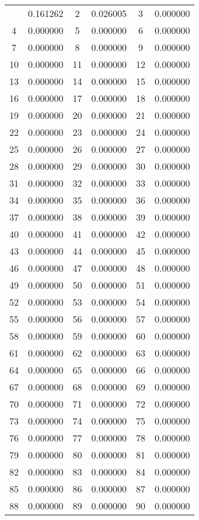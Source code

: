 \documentclass[12pt]{article}
\begin{document}
\begin{longtable}{@{}cc|cc|cc@{}}
\bottomrule
\endlastfoot
1 & 0.161262 & 2 & 0.026005 & 3 & 0.000000 \\
4 & 0.000000 & 5 & 0.000000 & 6 & 0.000000 \\
7 & 0.000000 & 8 & 0.000000 & 9 & 0.000000 \\
10 & 0.000000 & 11 & 0.000000 & 12 & 0.000000 \\
13 & 0.000000 & 14 & 0.000000 & 15 & 0.000000 \\
16 & 0.000000 & 17 & 0.000000 & 18 & 0.000000 \\
19 & 0.000000 & 20 & 0.000000 & 21 & 0.000000 \\
22 & 0.000000 & 23 & 0.000000 & 24 & 0.000000 \\
25 & 0.000000 & 26 & 0.000000 & 27 & 0.000000 \\
28 & 0.000000 & 29 & 0.000000 & 30 & 0.000000 \\
31 & 0.000000 & 32 & 0.000000 & 33 & 0.000000 \\
34 & 0.000000 & 35 & 0.000000 & 36 & 0.000000 \\
37 & 0.000000 & 38 & 0.000000 & 39 & 0.000000 \\
40 & 0.000000 & 41 & 0.000000 & 42 & 0.000000 \\
43 & 0.000000 & 44 & 0.000000 & 45 & 0.000000 \\
46 & 0.000000 & 47 & 0.000000 & 48 & 0.000000 \\
49 & 0.000000 & 50 & 0.000000 & 51 & 0.000000 \\
52 & 0.000000 & 53 & 0.000000 & 54 & 0.000000 \\
55 & 0.000000 & 56 & 0.000000 & 57 & 0.000000 \\
58 & 0.000000 & 59 & 0.000000 & 60 & 0.000000 \\
61 & 0.000000 & 62 & 0.000000 & 63 & 0.000000 \\
64 & 0.000000 & 65 & 0.000000 & 66 & 0.000000 \\
67 & 0.000000 & 68 & 0.000000 & 69 & 0.000000 \\
70 & 0.000000 & 71 & 0.000000 & 72 & 0.000000 \\
73 & 0.000000 & 74 & 0.000000 & 75 & 0.000000 \\
76 & 0.000000 & 77 & 0.000000 & 78 & 0.000000 \\
79 & 0.000000 & 80 & 0.000000 & 81 & 0.000000 \\
82 & 0.000000 & 83 & 0.000000 & 84 & 0.000000 \\
85 & 0.000000 & 86 & 0.000000 & 87 & 0.000000 \\
88 & 0.000000 & 89 & 0.000000 & 90 & 0.000000 \\

\end{longtable}
\end{document}
